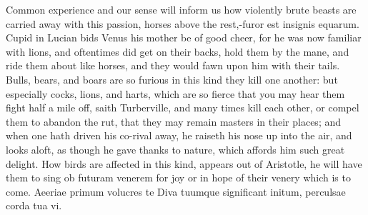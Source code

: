 Common experience and our sense will inform us how violently brute
beasts are carried away with this passion, horses above the rest,-furor
est insignis equarum. Cupid in Lucian bids Venus his mother be of
good cheer, for he was now familiar with lions, and oftentimes did get
on their backs, hold them by the mane, and ride them about like horses,
and they would fawn upon him with their tails. Bulls, bears, and boars
are so furious in this kind they kill one another: but especially
cocks,  lions, and harts, which are so fierce that you may hear
them fight half a mile off, saith Turberville, and many times
kill each other, or compel them to abandon the rut, that they may
remain masters in their places; and when one hath driven his co-rival
away, he raiseth his nose up into the air, and looks aloft, as though
he gave thanks to nature, which affords him such great delight. How
birds are affected in this kind, appears out of Aristotle, he will have
them to sing ob futuram venerem for joy or in hope of their venery
which is to come.
Aeeriae primum volucres te Diva tuumque
significant initum, perculsae corda tua vi.

